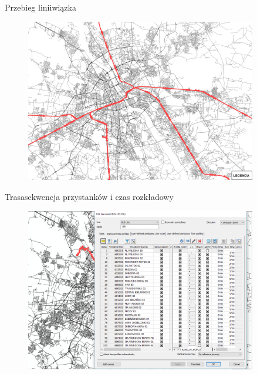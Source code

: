 \documentclass[8pt]{beamer}
\begin{document}
\begin{frame}{Przebieg linii}{wiązka}
\begin{figure}\begin{center}
\includegraphics[width=0.9\textwidth]{line3}
 \end{center}  \end{figure} 
\end{frame}

\begin{frame}{Trasa}{sekwencja przystanków i czas rozkładowy}
\begin{figure}\begin{center}
\includegraphics[width=0.9\textwidth]{route}
 \end{center}  \end{figure} 
\end{frame}
\end{document}
